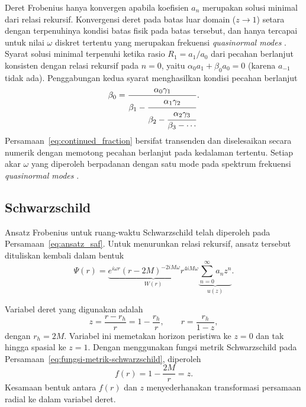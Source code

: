 Deret Frobenius hanya konvergen apabila koefisien $a_n$ merupakan solusi minimal dari relasi
rekursif. Konvergensi deret pada batas luar domain ($z \to 1$) setara dengan terpenuhinya kondisi batas fisik pada batas
tersebut, dan hanya tercapai untuk nilai $\omega$ diskret tertentu yang merupakan frekuensi
\textit{quasinormal modes} \parencite{Konoplya2011}. Syarat solusi minimal terpenuhi ketika
rasio $R_1 = a_1/a_0$ dari pecahan berlanjut konsisten dengan relasi rekursif pada $n = 0$,
yaitu $\alpha_0 a_1 + \beta_0 a_0 = 0$ (karena $a_{-1}$ tidak ada). Penggabungan kedua syarat
menghasilkan kondisi pecahan berlanjut
\begin{equation}
    \beta_0 = \frac{\alpha_0 \gamma_1}{\beta_1 - \cfrac{\alpha_1 \gamma_2}{\beta_2 - \cfrac{\alpha_2 \gamma_3}{\beta_3 - \cdots}}}.
    \label{eq:continued_fraction}
\end{equation}
Persamaan~\eqref{eq:continued_fraction} bersifat transenden dan diselesaikan secara numerik
dengan memotong pecahan berlanjut pada kedalaman tertentu. Setiap akar $\omega$ yang
diperoleh berpadanan dengan satu mode pada spektrum frekuensi \textit{quasinormal modes}
\parencite{Leaver1985, Konoplya2011}.

\subsection{Schwarzschild}
\label{subsec:deriv-schw}

Ansatz Frobenius untuk ruang-waktu Schwarzschild telah diperoleh pada Persamaan~\eqref{eq:ansatz_saf}. Untuk menurunkan relasi rekursif, ansatz tersebut dituliskan kembali dalam bentuk
\begin{equation}
    \Psi(r)=\underbrace{e^{i\omega r}(r-2M)^{-2iM\omega}r^{4iM\omega}}_{W(r)}\underbrace{\sum_{n=0}^{\infty}a_nz^n}_{u(z)}.
    \label{eq:ansatz-schw-full}
\end{equation} 

Variabel deret yang digunakan adalah
\begin{equation}
    z=\frac{r-r_h}{r}=1-\frac{r_h}{r}, \qquad r=\frac{r_h}{1-z},
    \label{eq:variabel-z-schw}
\end{equation}
dengan $r_h=2M$. Variabel ini memetakan horizon peristiwa ke $z=0$ dan tak hingga spasial ke $z=1$. Dengan menggunakan fungsi metrik Schwarzschild pada Persamaan~\eqref{eq:fungsi-metrik-schwarzschild}, diperoleh
\begin{equation}
    f(r)=1-\frac{2M}{r} = z.
    \label{eq:f-sama-dengan-z}
\end{equation}
Kesamaan bentuk antara $f(r)$ dan $z$ menyederhanakan transformasi persamaan radial ke dalam variabel deret.

